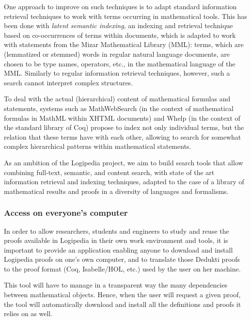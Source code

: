 One approach to improve on such techniques is to
adapt standard information retrieval techniques to work with terms
occurring in mathematical tools. This has been done\cite{DBLP:conf/mkm/Cairns04}
with \emph{latent semantic indexing}, an
indexing and retrieval technique based on co-occurrences of terms within
documents, which is adapted to work with statements from the Mizar
Mathematical Library (MML): terms, which are (lemmatized or stemmed)
words in regular natural language documents, are chosen to be type names,
operators, etc., in the mathematical language of the MML. Similarly to
regular information retrieval techniques, however, such a search cannot
interpret complex structures.

To deal with the actual (hierarchical) content of mathematical formulas
and statements, systems such as
MathWebSearch\cite{DBLP:conf/aisc/KohlhaseMP12} (in the context of
mathematical formulas in MathML within XHTML documents) and
Whelp\cite{DBLP:conf/types/AspertiGCTZ04} (in the context of the standard
library of Coq) propose to index not only individual terms, but the
relation that these terms have with each other, allowing to search for
somewhat complex hierarchical patterns within mathematical statements.

As an ambition of the Logipedia project, we aim to build search tools that allow
combining full-text, semantic, and content search, with state of the art
information retrieval and indexing techniques, adapted to the case of
a library of mathematical results and proofs in a diversity of languages
and formalisms.

\subsubsection*{Access on everyone's computer}

In order to allow researchers, students and engineers to study and
reuse the proofs available in Logipedia in their own work environment
and tools, it is important to provide an application enabling anyone
to download and install Logipedia proofs on one's own computer, and to
translate those Dedukti proofs to the proof format (Coq, Isabelle/HOL,
etc.) used by the user on her machine.

This tool will have to manage in a transparent way the many
dependencies between mathematical objects. Hence, when the user will
request a given proof, the tool will automatically download and
install all the definitions and proofs it relies on as well.

